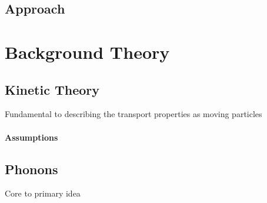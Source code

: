 \documentclass[12pt,titlepage,draft]{article}
\begin{document}
\subsection{Approach}




\section{Background Theory}
\subsection{Kinetic Theory}
Fundamental to describing the transport properties as moving particles
\paragraph{Assumptions}
\subsection{Phonons}
Core to primary idea
\end{document}
